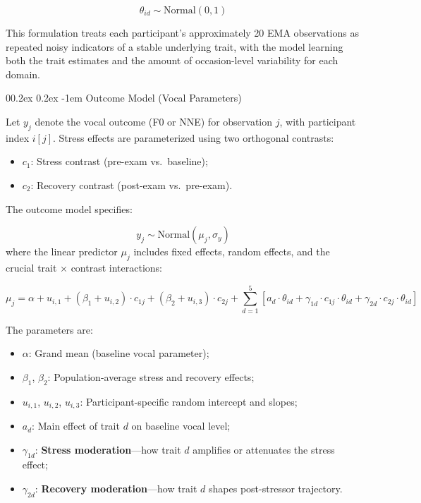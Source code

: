 \documentclass[
  english,
  man,floatsintext]{apa6}
\makeatletter
\let\oldparagraph\paragraph
\renewcommand{\paragraph}{
    \@ifstar
      \xxxParagraphStar
      \xxxParagraphNoStar
  }
\newcommand{\xxxParagraphStar}[1]{\oldparagraph*{#1}\mbox{}}
\newcommand{\xxxParagraphNoStar}[1]{\oldparagraph{#1}\mbox{}}
\providecommand{\tightlist}{%
  \setlength{\itemsep}{0pt}\setlength{\parskip}{0pt}}
\renewcommand{\paragraph}{\@startsection{paragraph}{4}{\parindent}%
  {0\baselineskip \@plus 0.2ex \@minus 0.2ex}%
  {-1em}%
  {\normalfont\normalsize\bfseries\itshape\typesectitle}}
\makeatother
\begin{document}
\[
\theta_{id} \sim \text{Normal}(0, 1)
\]

This formulation treats each participant's approximately 20 EMA observations as repeated noisy indicators of a stable underlying trait, with the model learning both the trait estimates and the amount of occasion-level variability for each domain.

\paragraph{Outcome Model (Vocal Parameters)}\label{outcome-model-vocal-parameters}

Let \(y_j\) denote the vocal outcome (F0 or NNE) for observation \(j\), with participant index \(i[j]\). Stress effects are parameterized using two orthogonal contrasts:

\begin{itemize}
\tightlist
\item
  \(c_1\): Stress contrast (pre-exam vs.~baseline);
\item
  \(c_2\): Recovery contrast (post-exam vs.~pre-exam).
\end{itemize}

The outcome model specifies:

\[
y_j \sim \text{Normal}(\mu_j, \sigma_y)
\]
where the linear predictor \(\mu_j\) includes fixed effects, random effects, and the crucial trait × contrast interactions:

\[
\mu_j = \alpha + u_{i,1} + (\beta_1 + u_{i,2}) \cdot c_{1j} + (\beta_2 + u_{i,3}) \cdot c_{2j} + \sum_{d=1}^{5} \left[ a_d \cdot \theta_{id} + \gamma_{1d} \cdot c_{1j} \cdot \theta_{id} + \gamma_{2d} \cdot c_{2j} \cdot \theta_{id} \right]
\]

The parameters are:

\begin{itemize}
\tightlist
\item
  \(\alpha\): Grand mean (baseline vocal parameter);
\item
  \(\beta_1\), \(\beta_2\): Population-average stress and recovery effects;
\item
  \(u_{i,1}\), \(u_{i,2}\), \(u_{i,3}\): Participant-specific random intercept and slopes;
\item
  \(a_d\): Main effect of trait \(d\) on baseline vocal level;
\item
  \(\gamma_{1d}\): \textbf{Stress moderation}---how trait \(d\) amplifies or attenuates the stress effect;
\item
  \(\gamma_{2d}\): \textbf{Recovery moderation}---how trait \(d\) shapes post-stressor trajectory.
\end{itemize}
\end{document}
